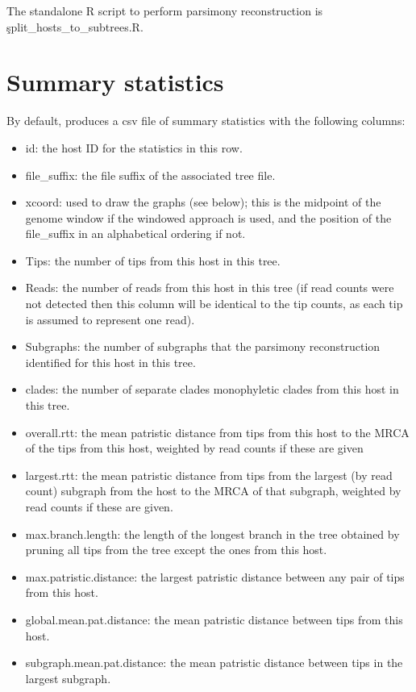 The standalone R script to perform parsimony reconstruction is \c{split\_hosts\_to\_subtrees.R}.

\section{Summary statistics} \label{sec:SumStats}

By default, \pat produces a csv file of summary statistics with the following columns:
\begin{itemize}
\item id: the host ID for the statistics in this row.
\item file\_suffix: the file suffix of the associated tree file.
\item xcoord: used to draw the graphs (see below); this is the midpoint of the genome window if the windowed approach is used, and the position of the file\_suffix in an alphabetical ordering if not.
\item Tips: the number of tips from this host in this tree.
\item Reads: the number of reads from this host in this tree (if read counts were not detected then this column will be identical to the tip counts, as each tip is assumed to represent one read).
\item Subgraphs: the number of subgraphs that the parsimony reconstruction identified for this host in this tree.
\item clades: the number of separate clades monophyletic clades from this host in this tree.
\item overall.rtt: the mean patristic distance from tips from this host to the MRCA of the tips from this host, weighted by read counts if these are given
\item largest.rtt: the mean patristic distance from tips from the largest (by read count) subgraph from the host to the MRCA of that subgraph, weighted by read counts if these are given.
\item max.branch.length: the length of the longest branch in the tree obtained by pruning all tips from the tree except the ones from this host.
\item max.patristic.distance: the largest patristic distance between any pair of tips from this host.
\item global.mean.pat.distance: the mean patristic distance between tips from this host.
\item subgraph.mean.pat.distance: the mean patristic distance between tips in the largest subgraph.

\end{itemize}
